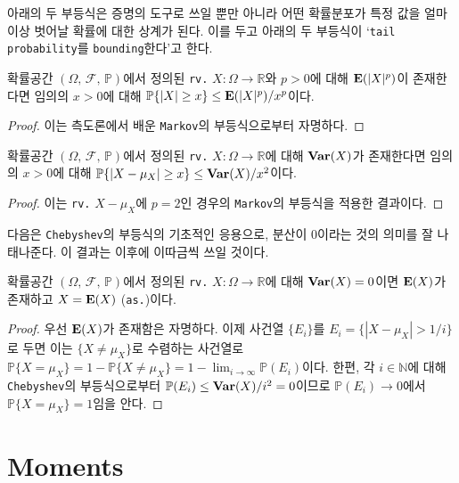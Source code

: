 아래의 두 부등식은 증명의 도구로 쓰일 뿐만 아니라 어떤 확률분포가 특정 값을 얼마 이상 벗어날 확률에 대한 상계가 된다. 이를 두고 아래의 두 부등식이 `\texttt{tail probability}를 \texttt{bounding}한다'고 한다.

\begin{theorem}
    확률공간 $(\Omega,\,\mathcal{F},\,\mathbb{P})$에서 정의된 \texttt{rv.} $X:\Omega\to\mathbb{R}$와 $p>0$에 대해 $\mathbf{E}(|X|^p)$이 존재한다면 임의의 $x>0$에 대해 $\mathbb{P}\{|X|\geq x\}\leq\mathbf{E}(|X|^p)/x^p$이다.
\end{theorem}

\begin{proof}
    이는 측도론에서 배운 \texttt{Markov}의 부등식으로부터 자명하다.
\end{proof}

\begin{corollary}
    확률공간 $(\Omega,\,\mathcal{F},\,\mathbb{P})$에서 정의된 \texttt{rv.} $X:\Omega\to\mathbb{R}$에 대해 $\mathbf{Var}(X)$가 존재한다면 임의의 $x>0$에 대해 $\mathbb{P}\{|X-\mu_X|\geq x\}\leq\mathbf{Var}(X)/x^2$이다.
\end{corollary}

\begin{proof}
    이는 \texttt{rv.} $X-\mu_X$에 $p=2$인 경우의 \texttt{Markov}의 부등식을 적용한 결과이다.
\end{proof}

다음은 \texttt{Chebyshev}의 부등식의 기초적인 응용으로, 분산이 $0$이라는 것의 의미를 잘 나태나준다. 이 결과는 이후에 이따금씩 쓰일 것이다.

\begin{proposition}
    확률공간 $(\Omega,\,\mathcal{F},\,\mathbb{P})$에서 정의된 \texttt{rv.} $X:\Omega\to\mathbb{R}$에 대해 $\mathbf{Var}(X)=0$이면 $\mathbf{E}(X)$가 존재하고 $X=\mathbf{E}(X)$ (\texttt{as.})이다.
\end{proposition}

\begin{proof}
    우선 $\mathbf{E}(X)$가 존재함은 자명하다. 이제 사건열 $\{E_i\}$를 $E_i=\{|X-\mu_X|>1/i\}$로 두면 이는 $\{X\ne\mu_X\}$로 수렴하는 사건열로 $\mathbb{P}\{X=\mu_X\}=1-\mathbb{P}\{X\ne\mu_X\}=1-\lim_{i\to\infty}\mathbb{P}(E_i)$이다. 한편, 각 $i\in\mathbb{N}$에 대해 \texttt{Chebyshev}의 부등식으로부터 $\mathbb{P}(E_i)\leq\mathbf{Var}(X)/i^2=0$이므로 $\mathbb{P}(E_i)\to0$에서 $\mathbb{P}\{X=\mu_X\}=1$임을 안다.
\end{proof}

\section{Moments}

